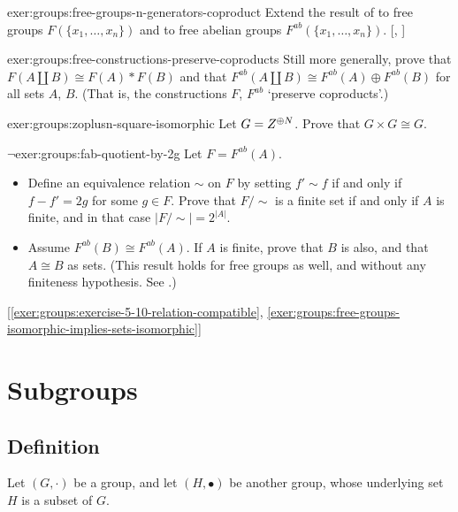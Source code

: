 \begin{exer}{\exerused}{exer:groups:free-groups-n-generators-coproduct}
  Extend the result of
   to free
  groups $F(\{x_1, \dots, x_n\})$ and to free abelian groups
  $F^{ab}(\{x_1, \dots,
  x_n\})$. [,
  ]
\end{exer}
\begin{exer}{}{exer:groups:free-constructions-preserve-coproducts}
  Still more generally, prove that $F(A \amalg B) \cong F(A) * F(B)$
  and that $F^{ab}(A \amalg B) \cong F^{ab}(A) \oplus F^{ab}(B)$ for
  all sets $A$, $B$. (That is, the constructions $F$, $F^{ab}$
  `preserve coproducts'.)
\end{exer}
\begin{exer}{}{exer:groups:zoplusn-square-isomorphic}
  Let $G = Z^{\oplus N}$. Prove that $G \times G \cong G$.
\end{exer}
\begin{exer}{$\lnot$}{exer:groups:fab-quotient-by-2g}
  Let $F = F^{ab}(A)$.
  \begin{itemize}
  \item Define an equivalence relation $\sim$ on $F$ by setting
    $f' \sim f$ if and only if $f - f' = 2g$ for some $g \in F$. Prove
    that $F/\!\sim$ is a finite set if and only if $A$ is finite, and
    in that case $|F/\!\sim| = 2^{|A|}$.
  \item Assume $F^{ab}(B) \cong F^{ab}(A)$. If $A$ is finite, prove
    that $B$ is also, and that $A \cong B$ as sets. (This result holds
    for free groups as well, and without any finiteness
    hypothesis. See
    .)
  \end{itemize} [\ref{exer:groups:exercise-5-10-relation-compatible},
  \ref{exer:groups:free-groups-isomorphic-implies-sets-isomorphic}]
\end{exer}

\section{Subgroups}
\label{sec:groups:subgroups}


\subsection{Definition}
\label{subsec:groups:subgroup-definition}
Let $(G, \cdot)$ be a group, and let $(H, \bullet)$ be another group,
whose underlying set $H$ is a subset of $G$.

